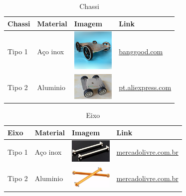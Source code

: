   \begin{table}[!htbp]
  \begin{center}
  \caption{Chassi}
  \begin{tabular}{|p{2cm}|p{3cm}|p{2cm}|p{4cm}|}
  \hline
  \textbf{Chassi} & \textbf{Material} & \textbf{Imagem} & \textbf{Link}\\\hline\hline
  Tipo 1 & Aço inox & \includegraphics[width=2cm]{figuras/chassi_inox.eps} & \href{http://www.banggood.com/pt/DIY-C600-DIY-Remote-Control-Crawler-Chassis-Smart-Track-Stainless-Stell-Metal-Tank-p-1079216.html}{banggood.com}\\\hline
  Tipo 2 & Aluminio & \includegraphics[width=2cm]{figuras/chassi_aluminio.eps} & \href{https://pt.aliexpress.com/store/product/New-25-aluminum-alloy-tracking-robot-tank-chassi-car-4WD-metal-tank-car-chassis-for-DIY/421824_32294898374.html}{pt.aliexpress.com}\\\hline
  \end{tabular}
  \end{center}
  \end{table}

  \begin{table}[!htbp]
  \begin{center}
  \caption{Eixo}
  \begin{tabular}{|p{2cm}|p{3cm}|p{2cm}|p{4cm}|}
  \hline
  \textbf{Eixo} & \textbf{Material} & \textbf{Imagem} & \textbf{Link}\\\hline\hline
  Tipo 1 & Aço inox & \includegraphics[width=2cm]{figuras/eixo_inox.eps} & \href{http://produto.mercadolivre.com.br/MLB-681527051-par-de-eixo-dogbone-84-mm-06061-redcat-himoto-exceed-hsp-_JM}{mercadolivre.com.br}\\\hline
  Tipo 2 & Aluminio  & \includegraphics[width=2cm]{figuras/eixo_aluminio.eps} & \href{http://produto.mercadolivre.com.br/MLB-700430643-eixos-dogbones-em-aluminio-mastadon-spino-himoto-23608-par-_JM}{mercadolivre.com.br}\\\hline
  \end{tabular}
  \end{center}
  \end{table}

